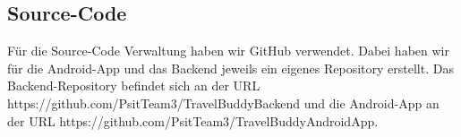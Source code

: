 \subsection{Source-Code}\label{sourcecode}
Für die Source-Code Verwaltung haben wir GitHub verwendet. Dabei haben wir für die Android-App und das Backend jeweils ein eigenes Repository erstellt. Das Backend-Repository befindet sich an der URL https://github.com/PsitTeam3/TravelBuddyBackend und die Android-App an der URL https://github.com/PsitTeam3/TravelBuddyAndroidApp.
